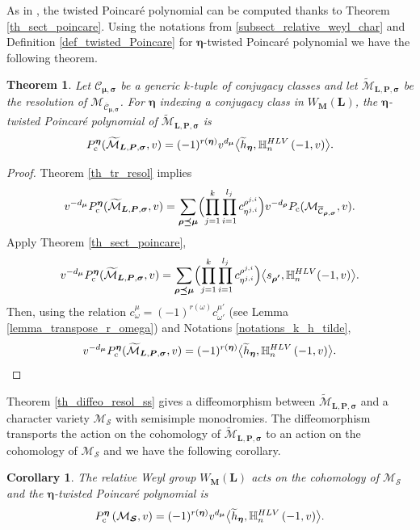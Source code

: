 \documentclass[11pt]{article}
\newcommand{\rc}{\mathrm{c}}
\newcommand{\HLV}{\textup{HLV}}
\newcommand{\blangle}{\bigl\langle}
\newcommand{\brangle}{\bigr\rangle}
\theoremstyle{definition}
\theoremstyle{plain}
\newtheorem{theorem}[definition]{Theorem}
\newtheorem{corollary}[definition]{Corollary}
\newcommand{\mcmus}{\mathcal{M}_{\overline{\mathcal{C}}_{\boldsymbol{\mu},\boldsymbol{\sigma}}}}
\newcommand{\mcmur}{\mathcal{M}_{\overline{\mathcal{C}}_{\boldsymbol{\rho},\boldsymbol{\sigma}}}}
\newcommand{\mlps}{\widetilde{\mathcal{M}}_{\boldsymbol{L},\boldsymbol{P},\boldsymbol{\sigma}}}
\begin{document}
As in \cite[Prop.\,1.9]{Letellier13}, the twisted Poincaré polynomial can be computed thanks to Theorem \ref{th_sect_poincare}. Using the notations from \ref{subsect_relative_weyl_char} and Definition \ref{def_twisted_Poincare} for $\boldsymbol{\eta}$-twisted Poincaré polynomial we have the following theorem.
\begin{theorem}\label{cor_twiste_Poincare_resol}
Let $\mathcal{C}_{\boldsymbol{\mu},\boldsymbol{\sigma}}$ be a generic $k$-tuple of conjugacy classes and let $\mlps$ be the resolution of $\mcmus$. For $\boldsymbol{\eta}$ indexing a conjugacy class in $W_{\boldsymbol{M}}(\boldsymbol{L})$, the $\boldsymbol{\eta}$-twisted Poincaré polynomial of $\mlps$ is
\[
P_{\rc}^{\boldsymbol{\eta}}(\mlps,v) = (-1)^{r(\boldsymbol{\eta})}v^{d_{\boldsymbol{\mu}}}\blangle \widetilde{h}_{\boldsymbol{\eta}},\mathbb{H}_n^{\HLV}\left(-1,v\right)\brangle.
\]
\end{theorem}
\begin{proof}
Theorem \ref{th_tr_resol} implies
\[
v^{-d_{\boldsymbol{\mu}}} P_{\rc}^{\boldsymbol{\eta}}(\mlps,v) = \sum_{\boldsymbol{\rho\preceq\mu}} \Bigl(\prod_{j=1}^k\prod_{i=1}^{l_j} c^{\rho^{j,i}}_{\eta^{j,i}}\Bigr) v^{-d_{\boldsymbol{\rho}}} P_{\rc}(\mcmur,v).
\]
Apply Theorem \ref{th_sect_poincare},
\begin{align*}
v^{-d_{\boldsymbol{\mu}}} P_{\rc}^{\boldsymbol{\eta}}(\mlps,v) = \sum_{\boldsymbol{\rho\preceq\mu}} \Bigl(\prod_{j=1}^k\prod_{i=1}^{l_j} c^{\rho^{j,i}}_{\eta^{j,i}}\Bigr)\blangle s_{\boldsymbol{\rho'}}, \mathbb{H}_n^{\HLV}(-1,v)\brangle.
\end{align*}
Then, using the relation $c_{\omega}^{\mu}=(-1)^{r(\omega)} c_{\omega'}^{\mu'}$ (see Lemma \ref{lemma_transpose_r_omega}) and Notations \ref{notations_k_h_tilde},
\[
v^{-d_{\boldsymbol{\mu}}} P_{\rc}^{\boldsymbol{\eta}}(\mlps,v) = (-1)^{r(\boldsymbol{\eta})}\blangle \widetilde{h}_{\boldsymbol{\eta}},\mathbb{H}_n^{\HLV}\left(-1,v\right)\brangle.\qedhere
\]
\end{proof}

Theorem \ref{th_diffeo_resol_ss} gives a diffeomorphism between $\mlps$ and a character variety $\mathcal{M}_{\boldsymbol{\mathcal{S}}}$ with semisimple monodromies. The diffeomorphism transports the action on the cohomology of $\mlps$ to an action on the cohomology of $\mathcal{M}_{\boldsymbol{\mathcal{S}}}$ and we have the following corollary.
\begin{corollary}
The relative Weyl group $W_{\boldsymbol{M}}(\boldsymbol{L})$ acts on the cohomology of $\mathcal{M}_{\boldsymbol{\mathcal{S}}}$ and the $\boldsymbol{\eta}$-twisted Poincaré polynomial is
\[
P_{\rc}^{\boldsymbol{\eta}}\left(\mathcal{M}_{\boldsymbol{\mathcal{S}}},v\right) = (-1)^{r(\boldsymbol{\eta})}v^{d_{\boldsymbol{\mu}}}\blangle \widetilde{h}_{\boldsymbol{\eta}},\mathbb{H}_n^{\HLV}\left(-1,v\right)\brangle.
\]
\end{corollary}
\end{document}
